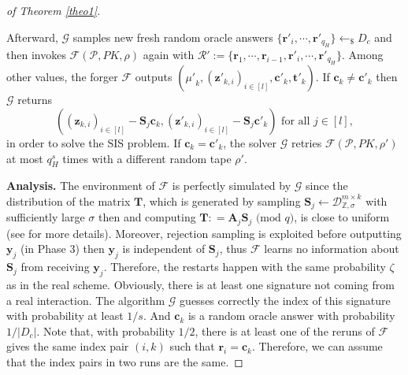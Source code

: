 \documentclass[runningheads]{llncs}
\begin{document}
\begin{proof}[of Theorem \ref{theo1}]
\begin{enumerate}
		Afterward, $\mathcal{G}$ samples new fresh random oracle answers $\{\mathbf{r}'_{i}, \cdots, \mathbf{r}'_{q_H}\} \leftarrow_{\$} D_c$ and then invokes $\mathcal{F}(\mathcal{P}, PK, \rho)$ again with $\mathcal{R}':=\{\mathbf{r}_1, \cdots, \mathbf{r}_{i-1}, \mathbf{r}'_{i}, \cdots, \mathbf{r}'_{q_H} \}$.
		Among other values, the forger $\mathcal{F}$ outputs $({\mu'}_k, (\mathbf{z}'_{k,i})_{i \in [l]}, \mathbf{c}'_k, \mathbf{t}'_k)$. If $\mathbf{c}_k \neq \mathbf{c}'_k$ then $\mathcal{G}$ returns $$((\mathbf{z}_{k,i})_{i \in [l]}-\mathbf{S}_j \mathbf{c}_k , (\mathbf{z}'_{k,i})_{i \in [l]}-\mathbf{S}_j \mathbf{c}'_k) \text{ for all }  j \in [l],$$
		in order to solve the \textsf{SIS} problem. If $\mathbf{c}_k = \mathbf{c}'_k$, the solver $\mathcal{G}$ retries $\mathcal{F}(\mathcal{P}, PK, \rho')$ at most $q_H^{s}$ times with a different random tape $\rho'$.
	\end{enumerate}	
	
	
	
	
	
	
	
	
	
	
	\textbf{Analysis.}  The environment of $\mathcal{F}$ is perfectly simulated by $\mathcal{G}$ since the distribution of the matrix $\textbf{T}$, which is generated by sampling $\mathbf{S}_{j} \leftarrow \mathcal{D}_{\mathbb{Z}, \sigma}^{m \times k}$ with sufficiently large $\sigma$ then and computing $\mathbf{T}: =\mathbf{A}_{j}\mathbf{S}_{j} \text{ (mod } q)$, is close to uniform (see \cite[lemma 5.2]{GPV08} for more details). Moreover, rejection sampling is exploited before outputting $\mathbf{y}_j$ (in Phase 3) then $\mathbf{y}_j$ is independent of $\mathbf{S}_j$, thus $\mathcal{F}$ learns no information about $\mathbf{S}_j$ from receiving $\mathbf{y}_j$.  Therefore, the restarts happen with the same probability $\zeta$ as in the real scheme.  Obviously, there is at least one  signature not coming from a real interaction. The algorithm $\mathcal{G}$ guesses correctly the index of this signature with probability at least $1/s$. And $\mathbf{c}_k$ is a random oracle answer with probability $1/|D_c|$. Note that, with probability $1/2$, there is at least one of the reruns of $\mathcal{F}$  gives the same index pair $(i,k)$  such that $\mathbf{r}_i=\mathbf{c}_k$. Therefore, we can assume that the index pairs in two runs are the same. 
	

\end{proof}
\end{document}
